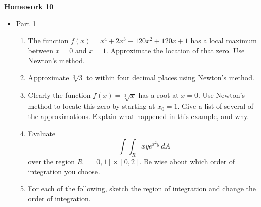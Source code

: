 \documentclass{article}
\begin{document}
 \begin{center}
    \large \textbf{Homework 10}
\end{center}
        \begin{itemize}
            \item Part 1
                \begin{enumerate}
                    \item The function $f(x)=x^4+2x^3 - 120x^2+120x + 1$ has a local maximum between $x=0$ and $x=1$.  Approximate the location of that zero. Use Newton's method.
                    \item Approximate $\sqrt[3]{3}$ to within four decimal places using Newton's method.
                    \item Clearly the function $f(x)= \sqrt[3]{x}$ has a root at $x=0$. Use Newton's method to locate this zero by starting at $x_0=1$. Give a list of several of the approximations. Explain what happened in this example, and why.
                     \item Evaluate $$\int\int_R xye^{x^2y}\,dA$$ 
                     over the region $R = [0,1]\times [0,2]$. Be wise about which order of integration you choose.
                     \item For each of the following, sketch the region of integration and change the order of integration.
                     \begin{enumerate}
                     

\end{enumerate}
\end{enumerate}
\end{itemize}
\end{document}
